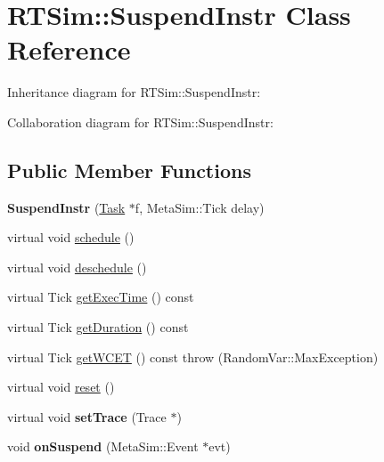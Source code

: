 \hypertarget{classRTSim_1_1SuspendInstr}{}\section{R\+T\+Sim\+:\+:Suspend\+Instr Class Reference}
\label{classRTSim_1_1SuspendInstr}


Inheritance diagram for R\+T\+Sim\+:\+:Suspend\+Instr\+:


Collaboration diagram for R\+T\+Sim\+:\+:Suspend\+Instr\+:
\subsection*{Public Member Functions}
\begin{DoxyCompactItemize}
\item 
{\bfseries Suspend\+Instr} (\hyperlink{classRTSim_1_1Task}{Task} $\ast$f, Meta\+Sim\+::\+Tick delay)\hypertarget{classRTSim_1_1SuspendInstr_a498f1109d89bf876b484e76aa941e724}{}\label{classRTSim_1_1SuspendInstr_a498f1109d89bf876b484e76aa941e724}

\item 
virtual void \hyperlink{classRTSim_1_1SuspendInstr_a0985c042f0472b5274e826dd08b0ee09}{schedule} ()
\item 
virtual void \hyperlink{classRTSim_1_1SuspendInstr_a55d444b4c60cc0c50a182ba03ae33eac}{deschedule} ()
\item 
virtual Tick \hyperlink{classRTSim_1_1SuspendInstr_a5c9dd583e022927282c47c2c7f36ac75}{get\+Exec\+Time} () const 
\item 
virtual Tick \hyperlink{classRTSim_1_1SuspendInstr_ad54be861b963b804bea2ab64710a6d27}{get\+Duration} () const 
\item 
virtual Tick \hyperlink{classRTSim_1_1SuspendInstr_a3176e412016cc7c03d1bc005c5998beb}{get\+W\+C\+ET} () const   throw (\+Random\+Var\+::\+Max\+Exception)
\item 
virtual void \hyperlink{classRTSim_1_1SuspendInstr_a6fbc2384193d2dfe70f39f2c492326e5}{reset} ()
\item 
virtual void {\bfseries set\+Trace} (Trace $\ast$)\hypertarget{classRTSim_1_1SuspendInstr_ae4f0209e5aeaf846989476816a89d523}{}\label{classRTSim_1_1SuspendInstr_ae4f0209e5aeaf846989476816a89d523}

\item 
void {\bfseries on\+Suspend} (Meta\+Sim\+::\+Event $\ast$evt)\hypertarget{classRTSim_1_1SuspendInstr_aa0d2c0e2a97fea4f3a889360658d5117}{}\label{classRTSim_1_1SuspendInstr_aa0d2c0e2a97fea4f3a889360658d5117}


\end{DoxyCompactItemize}
